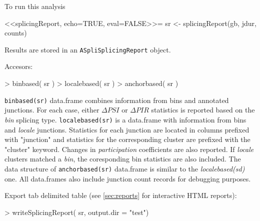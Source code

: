 \documentclass{article}
\begin{document}
To run this analysis

 <<splicingReport, echo=TRUE, eval=FALSE>>=
sr      <- splicingReport(gb, 
                          jdur, 
                          counts)

Results are stored in an \texttt{ASpliSplicingReport} object.

Accesors:

\begin{Schunk}
\begin{Sinput}
>  binbased( sr )
>  localebased( sr )
>  anchorbased( sr )
\end{Sinput}
\end{Schunk}

\texttt{binbased(sr)} data.frame combines information from bins and annotated junctions. For each case, either $\Delta PSI$ or $\Delta PIR$ statistics is reported based on the {\em bin} splicing type. \texttt{localebased(sr)}  is a data.frame with information from bins and {\em locale} junctions. Statistics for each junction are located in columns prefixed with "junction" and statistics for the corresponding cluster are prefixed with the "cluster" keyword. Changes in {\em participation} coefficients are also reported. If {\em locale} clusters matched a {\em bin}, the coresponding bin statistics are also included. The data structure of \texttt{anchorbased(sr)} data.frame is similar to the {\em localebased(sd)} one. All data.frames also include junction count records for debugging purposes.

Export tab delimited table (see \ref{sec:reports} for interactive HTML reports):

\begin{Schunk}
\begin{Sinput}
> writeSplicingReport( sr, output.dir = "test")
\end{Sinput}
\end{Schunk}
\end{document}
